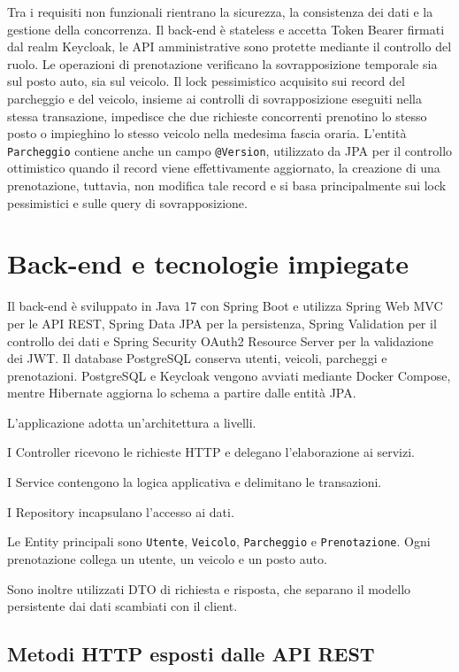 \documentclass[11pt,a4paper]{article}
\begin{document}
Tra i requisiti non funzionali rientrano la sicurezza, la consistenza dei dati e la gestione della concorrenza. Il back-end è stateless e accetta Token Bearer firmati dal realm Keycloak, le API amministrative sono protette mediante il controllo del ruolo. Le operazioni di prenotazione verificano la sovrapposizione temporale sia sul posto auto, sia sul veicolo. Il lock pessimistico acquisito sui record del parcheggio e del veicolo, insieme ai controlli di sovrapposizione eseguiti nella stessa transazione, impedisce che due richieste concorrenti prenotino lo stesso posto o impieghino lo stesso veicolo nella medesima fascia oraria. L'entità \texttt{Parcheggio} contiene anche un campo \texttt{@Version}, utilizzato da JPA per il controllo ottimistico quando il record viene effettivamente aggiornato, la creazione di una prenotazione, tuttavia, non modifica tale record e si basa principalmente sui lock pessimistici e sulle query di sovrapposizione.

\section{Back-end e tecnologie impiegate}

Il back-end è sviluppato in Java 17 con Spring Boot e utilizza Spring Web MVC per le API REST, Spring Data JPA per la persistenza, Spring Validation per il controllo dei dati e Spring Security OAuth2 Resource Server per la validazione dei JWT. Il database PostgreSQL conserva utenti, veicoli, parcheggi e prenotazioni. PostgreSQL e Keycloak vengono avviati mediante Docker Compose, mentre Hibernate aggiorna lo schema a partire dalle entità JPA.

L'applicazione adotta un'architettura a livelli. 

I Controller ricevono le richieste HTTP e delegano l'elaborazione ai servizi. 

I Service contengono la logica applicativa e delimitano le transazioni. 

I Repository incapsulano l'accesso ai dati. 

Le Entity principali sono \texttt{Utente}, \texttt{Veicolo}, \texttt{Parcheggio} e \texttt{Prenotazione}. Ogni prenotazione collega un utente, un veicolo e un posto auto.

Sono inoltre utilizzati DTO di richiesta e risposta, che separano il modello persistente dai dati scambiati con il client.

\subsection{Metodi HTTP esposti dalle API REST}
\end{document}
